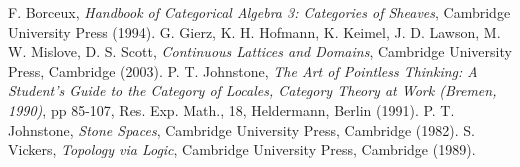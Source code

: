 \documentclass[12pt]{article}
\begin{document}
\begin{thebibliography}{8}
 F. Borceux, {\em Handbook of Categorical Algebra 3: Categories of Sheaves}, Cambridge University Press (1994).
 G. Gierz, K. H. Hofmann, K. Keimel, J. D. Lawson, M. W. Mislove, D. S. Scott, {\em Continuous Lattices and Domains}, Cambridge University Press, Cambridge (2003).
 P. T. Johnstone, {\em The Art of Pointless Thinking: A Student's Guide to the Category of Locales, Category Theory at Work (Bremen, 1990)}, pp 85-107, Res. Exp. Math., 18, Heldermann, Berlin (1991).
 P. T. Johnstone, {\em Stone Spaces}, Cambridge University Press, Cambridge (1982).
 S. Vickers, {\em Topology via Logic}, Cambridge University Press, Cambridge (1989).
\end{thebibliography}
\end{document}
